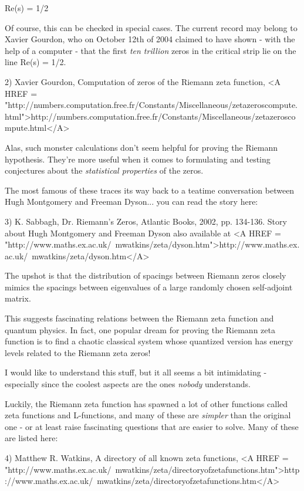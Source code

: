 Re(s) = 1/2

Of course, this can be checked in special cases.  The current record 
may belong to Xavier Gourdon, who on October 12th of 2004 claimed to 
have shown - with the help of a computer - that the first \emph{ten trillion}
zeros in the critical strip lie on the line Re(s) = 1/2.

2) Xavier Gourdon, Computation of zeros of the Riemann zeta function,
<A HREF = "http://numbers.computation.free.fr/Constants/Miscellaneous/zetazeroscompute.html">http://numbers.computation.free.fr/Constants/Miscellaneous/zetazeroscompute.html</A>


Alas, such monster calculations don't seem helpful for proving the Riemann 
hypothesis.  They're more useful when it comes to formulating and testing 
conjectures about the \emph{statistical properties} of the zeros. 
 
The most famous of these traces its way back to a teatime conversation
between Hugh Montgomery and Freeman Dyson... you can read the story here:

3) K. Sabbagh, Dr. Riemann's Zeros, Atlantic Books, 2002, pp. 134-136.
Story about Hugh Montgomery and Freeman Dyson also available at  
<A HREF = "http://www.maths.ex.ac.uk/~mwatkins/zeta/dyson.htm">http://www.maths.ex.ac.uk/~mwatkins/zeta/dyson.htm</A>

The upshot is that the distribution of spacings between Riemann zeros
closely mimics the spacings between eigenvalues of a large randomly
chosen self-adjoint matrix.  

This suggests fascinating relations between the Riemann zeta function 
and quantum physics.  In fact, one popular dream for proving the 
Riemann zeta function is to find a chaotic classical system whose
quantized version has energy levels related to the Riemann zeta zeros!

I would like to understand this stuff, but it all seems a bit 
intimidating - especially since the coolest aspects are the ones 
\emph{nobody} understands.  

Luckily, the Riemann zeta function has spawned a lot of other functions
called zeta functions and L-functions, and many of these are \emph{simpler}
than the original one - or at least raise fascinating questions that 
are easier to solve.  Many of these are listed here:

4) Matthew R. Watkins, A directory of all known zeta functions,
<A HREF = "http://www.maths.ex.ac.uk/~mwatkins/zeta/directoryofzetafunctions.htm">http://www.maths.ex.ac.uk/~mwatkins/zeta/directoryofzetafunctions.htm</A>

